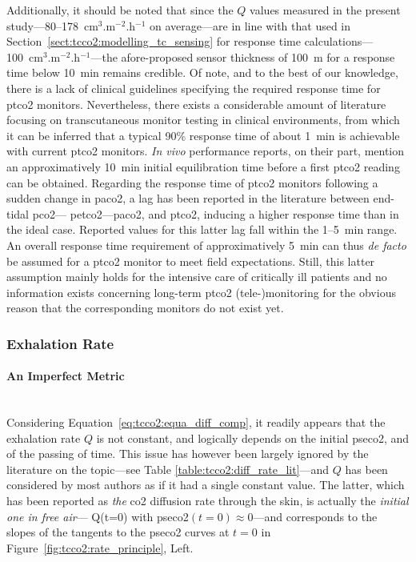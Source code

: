 Additionally, it should be noted that since the $Q$ values measured in the present study---80--178~cm$^3$.m$^{-2}$.h$^{-1}$ on average---are in line with that used in Section~\ref{sect:tcco2:modelling_tc_sensing} for response time calculations---100~cm$^3$.m$^{-2}$.h$^{-1}$---the afore-proposed sensor thickness of 100~{\textmu}m for a response time below 10~min remains credible. Of note, and to the best of our knowledge, there is a lack of clinical guidelines specifying the required response time for \gls{ptco2} monitors. Nevertheless, there exists a considerable amount of literature focusing on transcutaneous monitor testing in clinical environments, from which it can be inferred that a typical \invitro{} 90\% response time of about 1~min is achievable with current \gls{ptco2} monitors\cite{bendjelid2005, eberhard2007}. \textit{In vivo} performance reports, on their part, mention an approximatively 10~min initial equilibration time before a first \gls{ptco2} reading can be obtained\cite{carter2000, domingo2010, restrepo2012}. Regarding the response time of \gls{ptco2} monitors following a sudden change in \gls{paco2}, a lag has been reported in the literature between end-tidal \gls{pco2}---\ie{} \gls{petco2}---\gls{paco2}, and \gls{ptco2}, inducing a higher \invivo{} response time than in the ideal \invitro{} case. Reported values for this latter lag fall within the 1--5~min range\cite{kesten1991, carter2000, cuvelier2005, rafl2018}. An overall response time requirement of approximatively 5~min can thus \textit{de facto} be assumed for a \gls{ptco2} monitor to meet field expectations. Still, this latter assumption mainly holds for the intensive care of critically ill patients\cite{mari2019} and no information exists concerning long-term \gls{ptco2} (tele-)monitoring for the obvious reason that the corresponding monitors do not exist yet.

\subsubsection{Exhalation Rate}\label{subsect:tcco2:dis_skin_conduct}

\paragraph{An Imperfect Metric}\label{sect:tcco2:q_metric_choice}\mbox{}\\

Considering Equation~\ref{eq:tcco2:equa_diff_comp}, it readily appears that the exhalation rate $Q$ is not constant, and logically depends on the initial \gls{pseco2}, and of the passing of time. This issue has however been largely ignored by the literature on the topic---see Table \ref{table:tcco2:diff_rate_lit}---and $Q$ has been considered by most authors as if it had a single constant value. The latter, which has been reported as \emph{the} \gls{co2} diffusion rate through the skin, is actually the \emph{initial one in free air}---\ie{} Q(t=0) with \gls{pseco2}$(t=0)\approx 0$---and corresponds to the slopes of the tangents to the \gls{pseco2} curves at $t=0$ in Figure~\ref{fig:tcco2:rate_principle}, Left.

